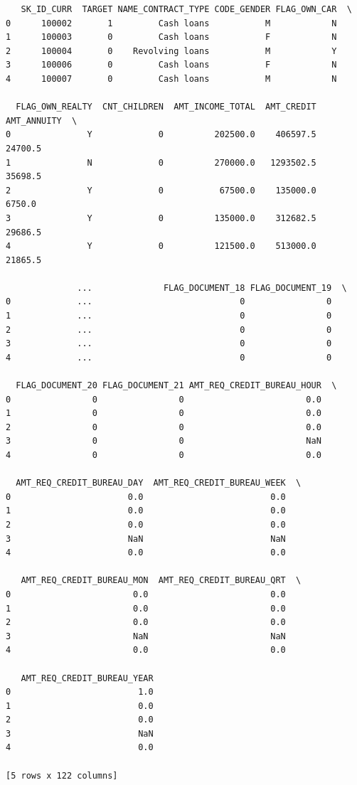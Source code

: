 \documentclass[11pt]{article}
\begin{document}
    
    \begin{verbatim}
   SK_ID_CURR  TARGET NAME_CONTRACT_TYPE CODE_GENDER FLAG_OWN_CAR  \
0      100002       1         Cash loans           M            N   
1      100003       0         Cash loans           F            N   
2      100004       0    Revolving loans           M            Y   
3      100006       0         Cash loans           F            N   
4      100007       0         Cash loans           M            N   

  FLAG_OWN_REALTY  CNT_CHILDREN  AMT_INCOME_TOTAL  AMT_CREDIT  AMT_ANNUITY  \
0               Y             0          202500.0    406597.5      24700.5   
1               N             0          270000.0   1293502.5      35698.5   
2               Y             0           67500.0    135000.0       6750.0   
3               Y             0          135000.0    312682.5      29686.5   
4               Y             0          121500.0    513000.0      21865.5   

              ...              FLAG_DOCUMENT_18 FLAG_DOCUMENT_19  \
0             ...                             0                0   
1             ...                             0                0   
2             ...                             0                0   
3             ...                             0                0   
4             ...                             0                0   

  FLAG_DOCUMENT_20 FLAG_DOCUMENT_21 AMT_REQ_CREDIT_BUREAU_HOUR  \
0                0                0                        0.0   
1                0                0                        0.0   
2                0                0                        0.0   
3                0                0                        NaN   
4                0                0                        0.0   

  AMT_REQ_CREDIT_BUREAU_DAY  AMT_REQ_CREDIT_BUREAU_WEEK  \
0                       0.0                         0.0   
1                       0.0                         0.0   
2                       0.0                         0.0   
3                       NaN                         NaN   
4                       0.0                         0.0   

   AMT_REQ_CREDIT_BUREAU_MON  AMT_REQ_CREDIT_BUREAU_QRT  \
0                        0.0                        0.0   
1                        0.0                        0.0   
2                        0.0                        0.0   
3                        NaN                        NaN   
4                        0.0                        0.0   

   AMT_REQ_CREDIT_BUREAU_YEAR  
0                         1.0  
1                         0.0  
2                         0.0  
3                         NaN  
4                         0.0  

[5 rows x 122 columns]
    \end{verbatim}
\end{document}

